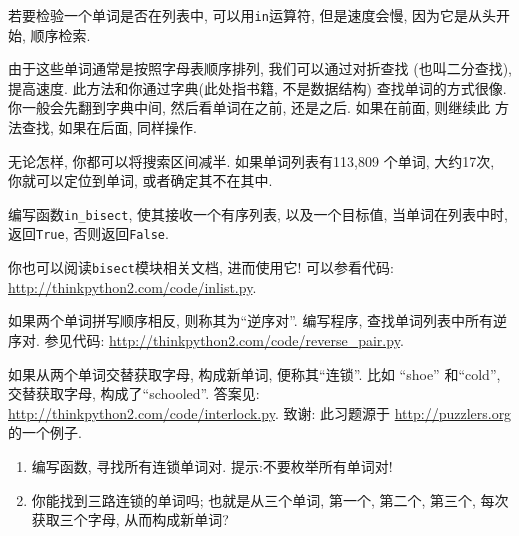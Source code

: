 \documentclass[10pt]{book}
\begin{document}
\begin{exercise}
\label{wordlist1}
\label{bisection}
若要检验一个单词是否在列表中, 可以用{\tt in}运算符, 
但是速度会慢, 因为它是从头开始, 顺序检索. 

由于这些单词通常是按照字母表顺序排列, 我们可以通过对折查找
(也叫二分查找), 提高速度. 此方法和你通过字典(此处指书籍, 不是数据结构)
查找单词的方式很像. 
你一般会先翻到字典中间, 然后看单词在之前, 还是之后. 如果在前面, 则继续此
方法查找, 如果在后面, 同样操作. 

无论怎样, 你都可以将搜索区间减半. 
如果单词列表有113,809 个单词, 大约17次, 你就可以定位到单词, 
或者确定其不在其中.

编写函数\verb"in_bisect",  使其接收一个有序列表, 以及一个目标值, 
当单词在列表中时, 返回{\tt True},  否则返回{\tt False}. 

你也可以阅读{\tt bisect}模块相关文档, 进而使用它!
可以参看代码: \url{http://thinkpython2.com/code/inlist.py}.

\end{exercise}

\begin{exercise}

如果两个单词拼写顺序相反, 则称其为``逆序对''.
编写程序, 查找单词列表中所有逆序对.
参见代码: \url{http://thinkpython2.com/code/reverse_pair.py}.

\end{exercise}

\begin{exercise}
如果从两个单词交替获取字母, 构成新单词, 便称其``连锁''. 
比如 ``shoe'' 和``cold'', 交替获取字母, 构成了``schooled''. 
答案见: \url{http://thinkpython2.com/code/interlock.py}.
致谢: 此习题源于 \url{http://puzzlers.org} 的一个例子.

\begin{enumerate}

\item 编写函数, 寻找所有连锁单词对. 提示:不要枚举所有单词对!

\item 你能找到三路连锁的单词吗; 也就是从三个单词, 第一个, 第二个, 第三个, 
每次获取三个字母, 从而构成新单词?

\end{enumerate}
\end{exercise}
\end{document}
